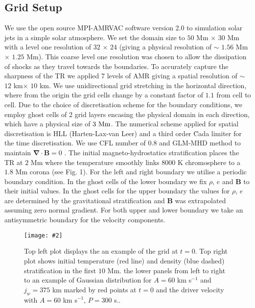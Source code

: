 \documentclass[12pt]{ociamthesis}
\newcommand{\bs}[1]{\boldsymbol{#1}}
\newcommand{\mfig}[4]{
  \begin{figure}
  \begin{center}
  \texttt{[image: \#2]}
  \caption{#3}
  \label{#4}
  \end{center}
  \end{figure}}
\begin{document}
\subsection{Grid Setup}
\label{sec:Grid_Setup}
We use the open source MPI-AMRVAC software version 2.0 \cite{Xia_2017} to simulation solar jets in a simple solar atmosphere. We set the domain size to $50$ Mm $\times$ $30$ Mm with a level one resolution of $32$ $\times$ $24$ (giving a physical resolution of $\sim$ $1.56$ Mm $\times$ $1.25$ Mm). This coarse level one resolution was chosen to allow the dissipation of shocks as they travel towards the boundaries. To accurately capture the sharpness of the TR we applied 7 levels of AMR giving a spatial resolution of $\sim$ $12$ km$\times$ $10$ km. We use unidirectional grid stretching in the horizontal direction, where from the origin the grid cells change by a constant factor of $1.1$ from cell to cell. Due to the choice of discretisation scheme for the boundary conditions, we employ ghost cells of 2 grid layers encasing the physical domain in each direction, which have a physical size of $3 \ \rm{Mm}$. The numerical scheme applied for spatial discretisation is HLL (Harten-Lax-van Leer) \cite{hll_1983} and a third order \u{C}ada limiter \citep{CADA20094118} for the time discretisation. We use CFL number of $0.8$ and GLM-MHD method to maintain $\bs{\nabla} \cdot \bs{B}=0$ \citep{DEDNER2002645}. The initial magneto-hydrostatics stratification places the TR at $2$ Mm where the temperature smoothly links $8000$ K chromosphere to a $1.8$ Mm corona (see Fig. 1). For the left and right boundary we utilise a periodic boundary condition. In the  ghost cells of the lower boundary we fix $\rho$, $e$ and $\bs{B}$ to their initial values. In the ghost cells for the upper boundary the values for $\rho$, $e$ are determined by the gravitational stratification and $\bs{B}$ was extrapolated assuming zero normal gradient. For both upper and lower boundary we take an antisymmetric boundary for the velocity components.
\mfig{1}{figures/numerical_Setup.png}{Top left plot displays the an example of the grid at $t=0$. Top right plot shows initial temperature (red line) and density (blue dashed) stratification in the first $10$ Mm. the lower panels from left to right to an example of Gaussian distribution for $A=60$ km s$^{-1}$ and $j_w=375$ km marked by red points at $t=0$ and the driver velocity with $A=60$ km s$^{-1}$, $P=300$ s..}{atoms_profile}
\end{document}
